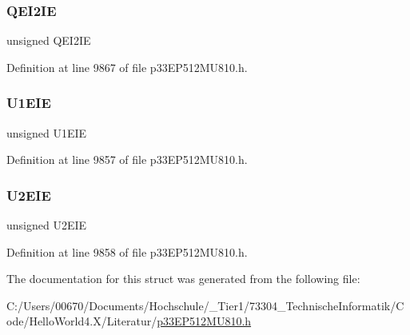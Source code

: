 \subsubsection{\texorpdfstring{Q\+E\+I2\+IE}{QEI2IE}}
{\footnotesize\ttfamily unsigned Q\+E\+I2\+IE}



Definition at line 9867 of file p33\+E\+P512\+M\+U810.\+h.

\mbox{\label{structtag_i_e_c4_b_i_t_s_a2c53adea7c812c57e63ee8456d0c272b}} 
\subsubsection{\texorpdfstring{U1\+E\+IE}{U1EIE}}
{\footnotesize\ttfamily unsigned U1\+E\+IE}



Definition at line 9857 of file p33\+E\+P512\+M\+U810.\+h.

\mbox{\label{structtag_i_e_c4_b_i_t_s_af9bb0592109b652c78294072ea7a6d18}} 
\subsubsection{\texorpdfstring{U2\+E\+IE}{U2EIE}}
{\footnotesize\ttfamily unsigned U2\+E\+IE}



Definition at line 9858 of file p33\+E\+P512\+M\+U810.\+h.



The documentation for this struct was generated from the following file\+:\begin{DoxyCompactItemize}
\item 
C\+:/\+Users/00670/\+Documents/\+Hochschule/\+\_\+\+Tier1/73304\+\_\+\+Technische\+Informatik/\+Code/\+Hello\+World4.\+X/\+Literatur/\hyperlink{p33_e_p512_m_u810_8h}{p33\+E\+P512\+M\+U810.\+h}\end{DoxyCompactItemize}
